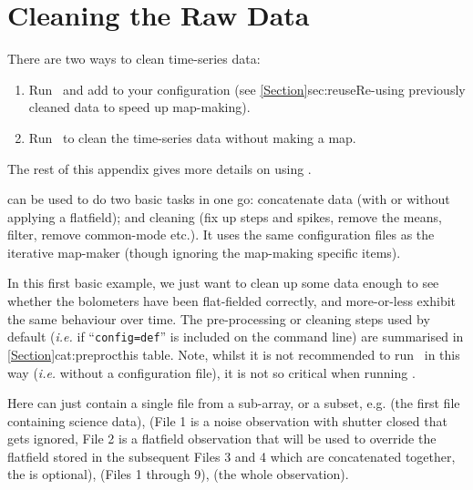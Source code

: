 \chapter{Cleaning the Raw Data}
\label{app:clean}

There are two ways to clean time-series data:

\begin{enumerate}
\item Run \makemap\ and add  to your
configuration (see \cref{Section}{sec:reuse}{Re-using previously cleaned
data to speed up map-making}).
\item Run \clean\ to clean the time-series data without making a map.
\end{enumerate}

The rest of this appendix gives more details on using \clean.

 can be used to do two basic tasks in one go:
concatenate data (with or without applying a flatfield); and cleaning
(fix up steps and spikes, remove the means, filter, remove common-mode
etc.). It uses the same configuration files as the iterative map-maker
(though ignoring the map-making specific items).

In this first basic example, we just want to clean up some data enough
to see whether the bolometers have been flat-fielded correctly, and
more-or-less exhibit the same behaviour over time. The pre-processing
or cleaning steps used by default (\emph{i.e.} if ``\texttt{config=def}''
is included on the command line) are summarised in
\cref{Section}{cat:preproc}{this table}. Note, whilst it is not
recommended to run \makemap\ in this way (\emph{i.e.} without a
configuration file), it is not so critical when running \clean.

\begin{terminalv}
\end{terminalv}

Here  can just contain a single file from a sub-array, or a
subset, e.g.  (the first file
containing science data),  (File
1 is a noise observation with shutter closed that gets ignored, File 2
is a flatfield observation that will be used to override the flatfield
stored in the subsequent Files 3 and 4 which are concatenated
together, the  is optional),
 (Files 1 through 9),
 (the whole observation).

